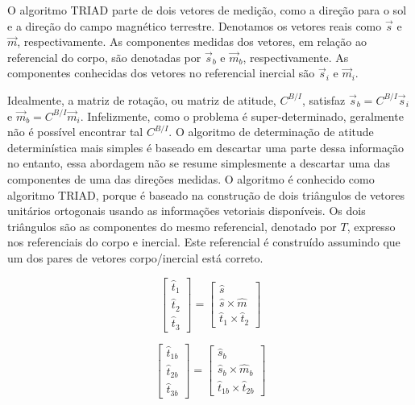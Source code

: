 O algoritmo TRIAD parte de dois vetores de medição, como a direção para o sol e a direção do campo magnético terrestre. Denotamos os vetores reais como $\vec{s}$ e $\vec{m}$, respectivamente. As componentes medidas dos vetores, em relação ao referencial do corpo, são denotadas por $\vec{s}_b$ e $\vec{m}_b$, respectivamente. As componentes conhecidas dos vetores no referencial inercial são $\vec{s}_i$ e $\vec{m}_i$.

Idealmente, a matriz de rotação, ou matriz de atitude, $C^{B/I}$, satisfaz $\vec{s}_b=C^{B/I}\vec{s}_i$ e $\vec{m}_b=C^{B/I}\vec{m}_i$. Infelizmente, como o problema é super-determinado, geralmente não é possível encontrar tal $C^{B/I}$. O algoritmo de determinação de atitude determinística mais simples é baseado em descartar uma parte dessa informação no entanto, essa abordagem não se resume simplesmente a descartar uma das componentes de uma das direções medidas. O algoritmo é conhecido como algoritmo TRIAD, porque é baseado na construção de dois triângulos de vetores unitários ortogonais usando as informações vetoriais disponíveis. Os dois triângulos são as componentes do mesmo referencial, denotado por $T$, expresso nos referenciais do corpo e inercial. Este referencial é construído assumindo que um dos pares de vetores corpo/inercial está correto.


\begin{equation}
\begin{bmatrix} \hat{t}_1 \\ \hat{t}_2 \\ \hat{t}_3
\end{bmatrix} = \begin{bmatrix} \hat{s} \\  \hat{s}\times\hat{m} 
\\ \hat{t}_1\times\hat{t}_2
\end{bmatrix}
\end{equation}

\begin{equation}
\begin{bmatrix} \hat{t}_{1b} \\ \hat{t}_{2b} \\ \hat{t}_{3b}
\end{bmatrix} = \begin{bmatrix} \hat{s}_b \\  \hat{s}_b\times\hat{m}_b 
\\ \hat{t}_{1b}\times\hat{t}_{2b}
\end{bmatrix}
\end{equation}

